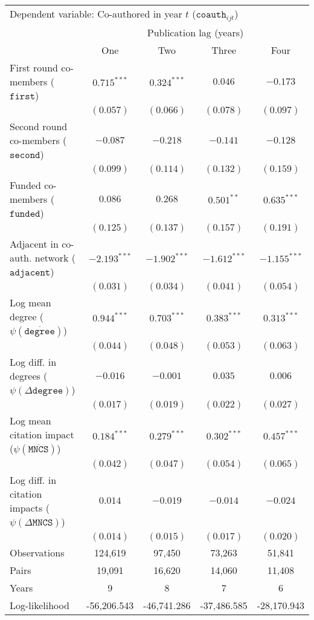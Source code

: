 \begin{tabular}{l c c c c}
\toprule
\multicolumn{5}{l}{Dependent variable: Co-authored in year $t$ ($\mathtt{coauth}_{ijt}$)} \\
& \multicolumn{4}{c}{Publication lag (years)} \\
\cmidrule(lr){2-5}
& One & Two & Three & Four \\
\midrule
First round co-members ($\mathtt{first}$) & $0.715^{***}$ & $0.324^{***}$ & $0.046$ & $-0.173$ \\
& $(0.057)$ & $(0.066)$ & $(0.078)$ & $(0.097)$ \\
Second round co-members ($\mathtt{second}$) & $-0.087$ & $-0.218$ & $-0.141$ & $-0.128$ \\
& $(0.099)$ & $(0.114)$ & $(0.132)$ & $(0.159)$ \\
Funded co-members ($\mathtt{funded}$) & $0.086$ & $0.268$ & $0.501^{**}$ & $0.635^{***}$ \\
& $(0.125)$ & $(0.137)$ & $(0.157)$ & $(0.191)$ \\
Adjacent in co-auth. network ($\mathtt{adjacent}$) & $-2.193^{***}$ & $-1.902^{***}$ & $-1.612^{***}$ & $-1.155^{***}$ \\
& $(0.031)$ & $(0.034)$ & $(0.041)$ & $(0.054)$ \\
Log mean degree ($\psi(\overline{\mathtt{degree}})$) & $0.944^{***}$ & $0.703^{***}$ & $0.383^{***}$ & $0.313^{***}$ \\
& $(0.044)$ & $(0.048)$ & $(0.053)$ & $(0.063)$ \\
Log diff. in degrees ($\psi(\Delta \mathtt{degree})$) & $-0.016$ & $-0.001$ & $0.035$ & $0.006$ \\
& $(0.017)$ & $(0.019)$ & $(0.022)$ & $(0.027)$ \\
Log mean citation impact ($\psi(\overline{\mathtt{MNCS}})$) & $0.184^{***}$ & $0.279^{***}$ & $0.302^{***}$ & $0.457^{***}$ \\
& $(0.042)$ & $(0.047)$ & $(0.054)$ & $(0.065)$ \\
Log diff. in citation impacts ($\psi(\Delta\mathtt{MNCS})$) & $0.014$ & $-0.019$ & $-0.014$ & $-0.024$ \\
& $(0.014)$ & $(0.015)$ & $(0.017)$ & $(0.020)$ \\
\midrule
Observations & 124,619 & 97,450 & 73,263 & 51,841 \\
\quad Pairs & 19,091 & 16,620 & 14,060 & 11,408 \\
\quad Years & 9 & 8 & 7 & 6 \\
Log-likelihood & -56,206.543 & -46,741.286 & -37,486.585 & -28,170.943 \\
\bottomrule
\end{tabular}
